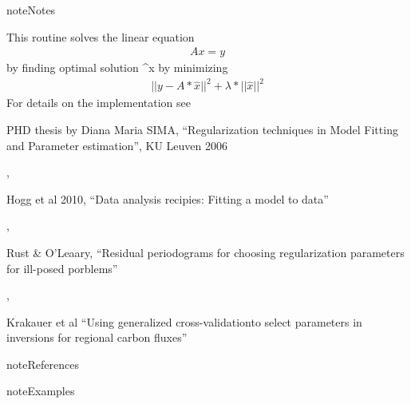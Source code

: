 \documentclass[a4paper,10pt,english]{sphinxmanual}
\begin{document}
\begin{fulllineitems}
\begin{quote}
\begin{description}
\begin{itemize}
\end{itemize}


\end{description}\end{quote}

\begin{sphinxadmonition}{note}{Notes}

This routine solves the linear equation
\begin{equation*}
\begin{split}A x = y\end{split}
\end{equation*}
by finding optimal solution \textasciicircum{}x by minimizing
\begin{equation*}
\begin{split}||y-A*\hat{x}||^2 + \lambda * ||\hat{x}||^2\end{split}
\end{equation*}
For details on the implementation see %
\begin{footnote}[1]\sphinxAtStartFootnote
PHD thesis by Diana Maria SIMA, “Regularization techniques in
Model Fitting and Parameter estimation”, KU Leuven 2006
%
\end{footnote}, %
\begin{footnote}[2]\sphinxAtStartFootnote
Hogg et al 2010, “Data analysis recipies: Fitting a model to data”
%
\end{footnote}, %
\begin{footnote}[3]\sphinxAtStartFootnote
Rust \& O’Leaary, “Residual periodograms for choosing regularization
parameters for ill-posed porblems”
%
\end{footnote}, %
\begin{footnote}[4]\sphinxAtStartFootnote
Krakauer et al “Using generalized cross-validationto select
parameters in inversions for regional carbon fluxes”
%
\end{footnote}
\end{sphinxadmonition}

\begin{sphinxadmonition}{note}{References}
\end{sphinxadmonition}

\begin{sphinxadmonition}{note}{Examples}


\end{sphinxadmonition}
\end{fulllineitems}
\end{document}
